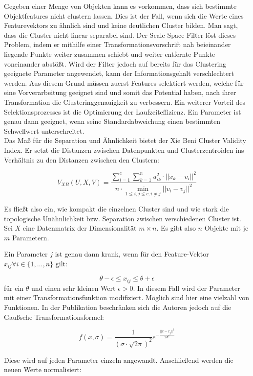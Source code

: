 \documentclass[11pt,ceqn]{book}
\begin{document}
Gegeben einer Menge von Objekten kann es vorkommen, dass sich bestimmte Objektfeatures nicht clustern lassen. Dies ist der Fall, wenn sich die Werte eines Featurevektors zu ähnlich sind und keine deutlichen Cluster bilden. Man sagt, dass die Cluster nicht linear separabel sind. Der Scale Space Filter löst dieses Problem, indem er mithilfe einer Transformationsvorschrift nah beieinander liegende Punkte weiter zusammen schiebt und weiter entfernte Punkte voneinander abstößt. Wird der Filter jedoch auf bereits für das Clustering geeignete Parameter angewendet, kann der Informationsgehalt verschlechtert werden. Aus diesem Grund müssen zuerst Features selektiert werden, welche für eine Vorverarbeitung geeignet sind und somit das Potential haben, nach ihrer Transformation die Clusteringgenauigkeit zu verbessern. Ein weiterer Vorteil des Selektionsprozesses ist die Optimierung der Laufzeiteffizienz. Ein Parameter ist genau dann geeignet, wenn seine Standardabweichung einen bestimmten Schwellwert unterschreitet.
\\
Das Maß für die Separation und Ähnlichkeit bietet der Xie Beni Cluster Validity Index. Er setzt die Distanzen zwischen Datenpunkten und Clusterzentroiden ins Verhältnis zu den Distanzen zwischen den Clustern:

$$V_{XB}(U,X,V)= \frac{\sum\limits_{i=1}^c \sum\limits_{k=1}^n u_{ik}^2 \cdot ||x_k-v_i||^2}{n \cdot \min\limits_{1\leqslant i,j \leqslant c, i \neq j}||v_i-v_j||^2}$$

Es fließt also ein, wie kompakt die einzelnen Cluster sind und wie stark die topologische Unähnlichkeit bzw. Separation zwischen verschiedenen Cluster ist.
\\
Sei $X$ eine Datenmatrix der Dimensionalität $m\times n$. Es gibt also $n$ Objekte mit je $m$ Parametern. 

Ein Parameter $j$ ist genau dann krank, wenn für den Feature-Vektor $x_{ij} \forall i\in \{1,\dots, n\}$ gilt:

$$\theta-\epsilon\leqslant x_{ij} \leqslant\theta+\epsilon$$ 
für ein $\theta$ und einen sehr kleinen Wert $\epsilon>0$. In diesem Fall wird der Parameter mit einer Transformationsfunktion modifiziert. Möglich sind hier eine vielzahl von Funktionen. In der Publikation beschränken sich die Autoren jedoch auf die Gaußsche Transformationsformel:

$$f(x,\sigma) = \frac{1}{(\sigma \cdot \sqrt{2\pi})^2}e^{-\frac{||x-x_j||^2}{2\sigma^2}}$$

Diese wird auf jeden Parameter einzeln angewandt. Anschließend werden die neuen Werte normalisiert:
\end{document}
